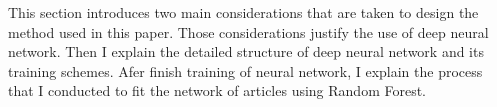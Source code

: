 This section introduces two main considerations that are taken to design the method used in this paper.
Those considerations justify the use of deep neural network.
Then I explain the detailed structure of deep neural network and its training schemes.
Afer finish training of neural network, I explain the process that I conducted to fit the network of articles using Random Forest.
